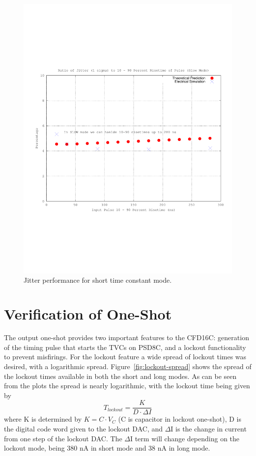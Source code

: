 \documentclass[12pt,oneside,final]{siuethesis}
\theoremstyle{definition}
\begin{document}
\begin{figure}[htbp!]
	\centering
 	\includegraphics[scale=0.7,keepaspectratio=true]{../Design_Reports/CFD_circuit_report/images/jitter_slow_mode.pdf}
 	\caption{Jitter performance for short time constant mode.}
 	\label{FIG:JITTER_SLOW}
\end{figure}

\section{Verification of One-Shot}

\par The output one-shot provides two important features to the CFD16C: generation of the timing pulse that starts the TVCs on PSD8C, and a lockout functionality to prevent misfirings. For the lockout feature a wide spread of lockout times was desired, with a logarithmic spread. Figure~\ref{fig:lockout-spread} shows the spread of the lockout times available in both the short and long modes. As can be seen from the plots the spread is nearly logarithmic, with the lockout time being given by 
\begin{equation}
T_{lockout} = \frac{K}{D\cdot \Delta I}
\label{eq:lockout}
\end{equation}
where K is determined by $K = C\cdot V_{C}$ (C is capacitor in lockout one-shot), D is the digital code word given to the lockout DAC, and $\Delta$I is the change in current from one step of the lockout DAC. The $\Delta$I term will change depending on the lockout mode, being 380 nA in short mode and 38 nA in long mode. 
\end{document}
